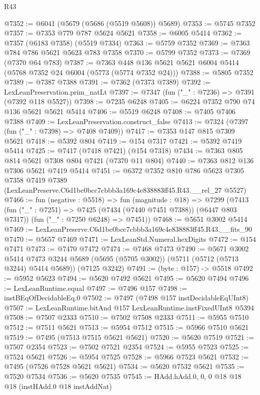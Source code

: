 \begin{lexlean}{R43}
\begin{coremodule}
@7352 := @6041 (@5679 (@5686 (@5519 @5608)) @5689)
@7353 := @5745 @7352
@7357 := @7353 @779 @787 @5624 @5621
@7358 := @6005 @5414
@7362 := @7357 (@6183 @7358) (@5519 @7334)
@7363 := @5759 @7352
@7369 := @7363 @784 @786 @5621 @5623 @783 @7358
@7370 := @5799 @7352
@7373 := @7369 (@7370 @64 @783)
@7387 := @7363 @448 @136 @5621 @5621 @6004 @5414 (@5768 @7352 @24 @6004 (@5773 (@5774 @7352 @24)))
@7388 := @5805 @7352
@7389 := @7387 @7388
@7391 := @7362 (@7373 @7389)
@7392 := LexLeanPreservation.prim_natLt
@7397 := @7347 (fun ("_" : @7236) => @7391 (@7392 @118 @5527))
@7398 := @7235 @6248
@7405 := @6224 @7352 @790 @74 @136 @5621 @5621 @5414
@7406 := @5519 @6248
@7408 := @7405 @7406 @7388
@7409 := LexLeanPreservation.construct_false
@7413 := @7324 (@7397 (fun ("_" : @7398) => @7408 @7409))
@7417 := @7353 @147 @815 @7309 @5621
@7418 := @5392 @804
@7419 := @154 @7317
@7421 := @5392 @7419 @5414
@7425 := @7417 (@7418 @7421) (@154 @7318)
@7434 := @7363 @805 @814 @5621 @7308 @804 @7421 (@7370 @11 @804)
@7440 := @7363 @812 @136 @7306 @5621 @7419 @5414
@7451 := @6372
    @7352
    @810
    @786
    @5623
    @7305
    @7358
    @7419
    @7389
    (LexLeanPreserve.C6d1bc0bcc7cbbb3a169c4e838883ff45.R43.__rel_27 @5527)
@7466 := fun (negative : @5518) =>
  fun (magnitude : @18) =>
  @7299
    (@7413
      (fun ("_" : @7251) => @7425 (@7434 (@7440 @7451 @7388)) (@6447 @803 @7317))
      (fun ("_" : @7250 @6248) => @7451))
@7468 := @5651 @3002 @5414
@7469 := LexLeanPreserve.C6d1bc0bcc7cbbb3a169c4e838883ff45.R43.__fits_90
@7470 := @5657 @7469
@7471 := LexLeanStd.Numeral.hexDigits
@7472 := @154 @7471
@7473 := @7470 @7472
@7474 := @7468 @7473
@7490 := @5671
    @3002
    @5414
    @7473
    @3244
    @5689
    (@5695 (@5705 @3002))
    (@5711 (@5712 (@5713 @3244) @5414 @5689))
    (@7125 @3242)
@7491 := (byte : @157) -> @5518
@7492 := @5952 @5623
@7494 := @5620 @7492 @5621
@7495 := @5620 @7494
@7496 := LexLeanRuntime.equal
@7497 := @7496 @157
@7498 := instBEqOfDecidableEq.{0}
@7502 := @7497 (@7498 @157 instDecidableEqUInt8)
@7507 := LexLeanRuntime.bitAnd @157 LexLeanRuntime.instFixedUInt8 @5394
@7508 := @7507 @2333
@7510 := @7502 @7508 @2333
@7511 := @5955 @7510
@7512 := @7511 @5621
@7513 := @5954 @7512
@7515 := @5966 @7510 @5621
@7519 := @7495 (@7513 @7515 @5621 @5621)
@7520 := @5620 @7519
@7521 := @7507 @2354
@7523 := @7502 @7521 @2354
@7524 := @5955 @7523
@7525 := @7524 @5621
@7526 := @5954 @7525
@7528 := @5966 @7523 @5621
@7532 := @7495 (@7526 @7528 @5621 @5621)
@7534 := @5620 @7532 @5621
@7535 := @7520 @7534
@7536 := @5620 @7535
@7545 := HAdd.hAdd.{0, 0, 0} @18 @18 @18 (instHAdd.{0} @18 instAddNat)

\end{coremodule}
\end{lexlean}
